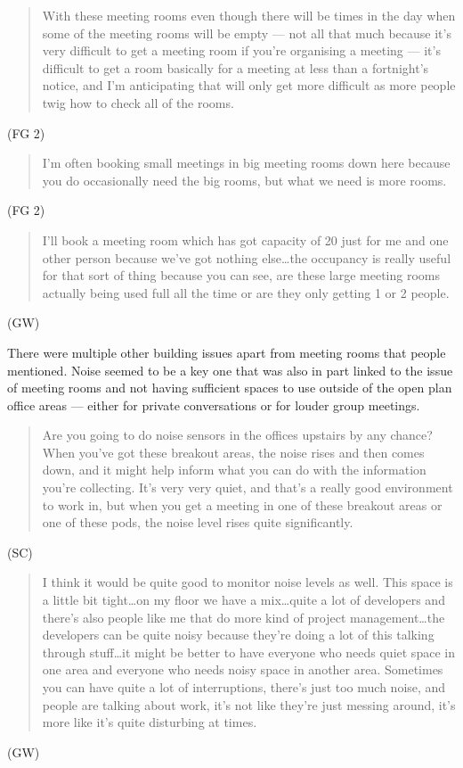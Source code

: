 \begin{quote}With these meeting rooms even though there will be times in the day
when some of the meeting rooms will be empty --- not all that much
because it’s very difficult to get a meeting room if you’re organising
a meeting --- it’s difficult to get a room basically for a meeting at
less than a fortnight’s notice, and I’m anticipating that will only
get more difficult as more people twig how to check all of the rooms.\end{quote}
(FG 2)

\begin{quote}I’m often booking small meetings in big meeting rooms
  down here because you do occasionally need the big rooms, but what
  we need is more rooms.\end{quote} (FG 2)

\begin{quote}I’ll book a meeting room which has got capacity of 20 just for me and
one other person because we’ve got nothing else…the occupancy is
really useful for that sort of thing because you can see, are these
large meeting rooms actually being used full all the time or are they
only getting 1 or 2 people.\end{quote} (GW)

There were multiple other building issues apart from meeting rooms
that people mentioned. Noise seemed to be a key one that was also in
part linked to the issue of meeting rooms and not having sufficient
spaces to use outside of the open plan office areas --- either for
private conversations or for louder group meetings.

\begin{quote}Are you going to do noise sensors in the offices upstairs by any
chance? When you’ve got these breakout areas, the noise rises and then
comes down, and it might help inform what you can do with the
information you’re collecting. It’s very very quiet, and that’s a
really good environment to work in, but when you get a meeting in one
of these breakout areas or one of these pods, the noise level rises
quite significantly.\end{quote} (SC)

\begin{quote}I think it would be quite good to monitor noise levels as well. This
space is a little bit tight\ldots on my floor we have a mix\ldots quite a lot of
developers and there’s also people like me that do more kind of
project management\ldots{}the developers can be quite noisy because they’re
doing a lot of this talking through stuff\ldots{}it might be better to have
everyone who needs quiet space in one area and everyone who needs
noisy space in another area. Sometimes you can have quite a lot of
interruptions, there’s just too much noise, and people are talking
about work, it’s not like they’re just messing around, it’s more like
it’s quite disturbing at times.\end{quote} (GW)

